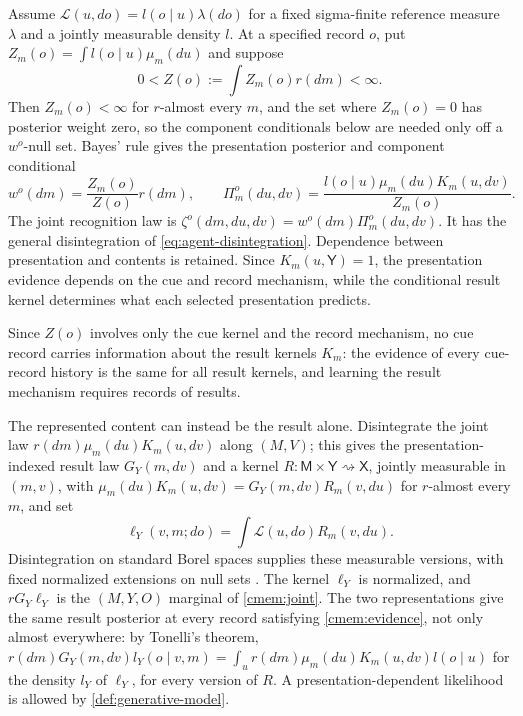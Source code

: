 Assume $\mathcal L(u,do)=l(o\mid u)\lambda(do)$ for a fixed sigma-finite reference measure $\lambda$ and a jointly measurable density $l$. At a specified record $o$, put $Z_m(o)=\int l(o\mid u)\mu_m(du)$ and suppose
\begin{equation}
 0<Z(o):=\int Z_m(o)r(dm)<\infty.
 \label{cmem:evidence}
\end{equation}
Then $Z_m(o)<\infty$ for $r$-almost every $m$, and the set where $Z_m(o)=0$ has posterior weight zero, so the component conditionals below are needed only off a $w^o$-null set.
Bayes' rule gives the presentation posterior and component conditional
\begin{equation}
 w^o(dm)=\frac{Z_m(o)}{Z(o)}r(dm),\qquad
 \Pi_m^o(du,dv)=\frac{l(o\mid u)\mu_m(du)K_m(u,dv)}{Z_m(o)}.
 \label{cmem:posterior}
\end{equation}
The joint recognition law is $\zeta^o(dm,du,dv)=w^o(dm)\Pi_m^o(du,dv)$. It has the general disintegration of \cref{eq:agent-disintegration}. Dependence between presentation and contents is retained. Since $K_m(u,\mathsf Y)=1$, the presentation evidence depends on the cue and record mechanism, while the conditional result kernel determines what each selected presentation predicts.

Since $Z(o)$ involves only the cue kernel and the record mechanism, no cue record carries information about the result kernels $K_m$: the evidence of every cue-record history is the same for all result kernels, and learning the result mechanism requires records of results.

The represented content can instead be the result alone. Disintegrate the joint law $r(dm)\mu_m(du)K_m(u,dv)$ along $(M,V)$; this gives the presentation-indexed result law $G_Y(m,dv)$ and a kernel $R:\mathsf M\times\mathsf Y\rightsquigarrow\mathsf X$, jointly measurable in $(m,v)$, with $\mu_m(du)K_m(u,dv)=G_Y(m,dv)R_m(v,du)$ for $r$-almost every $m$, and set
\begin{equation}
 \ell_Y(v,m;do)=\int\mathcal L(u,do)R_m(v,du).
 \label{cmem:result-model}
\end{equation}
Disintegration on standard Borel spaces supplies these measurable versions, with fixed normalized extensions on null sets \citep{Kallenberg2021}. The kernel $\ell_Y$ is normalized, and $rG_Y\ell_Y$ is the $(M,Y,O)$ marginal of \cref{cmem:joint}. The two representations give the same result posterior at every record satisfying \cref{cmem:evidence}, not only almost everywhere: by Tonelli's theorem, $r(dm)G_Y(m,dv)l_Y(o\mid v,m)=\int_ur(dm)\mu_m(du)K_m(u,dv)l(o\mid u)$ for the density $l_Y$ of $\ell_Y$, for every version of $R$. A presentation-dependent likelihood is allowed by \cref{def:generative-model}.

